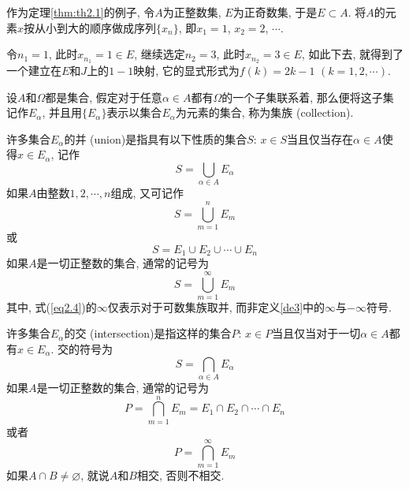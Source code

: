 \documentclass[cn,12pt,math=mtpro2,citestyle=gb7714-2015,bibstyle=gb7714-2015,twocol]{elegantbook}
\let\emptyset\varnothing
\begin{document}
\begin{example}
作为定理\ref{thm:th2.1}的例子, 令$A$为正整数集, $E$为正奇数集, 于是$E\subset A$. 将$A$的元素$x$按从小到大的顺序做成序列$\{x_n\}$, 即$x_1=1$, $x_2=2$, $\cdots$.

令$n_1=1$, 此时$x_{n_1}=1\in E$, 继续选定$n_2=3$, 此时$x_{n_2}=3\in E$, 如此下去, 就得到了一个建立在$E$和$J$上的$1-1$映射, 它的显式形式为$f(k)=2k-1$ $(k=1,2,\cdots)$.
\end{example}
\begin{definition}
设$A$和$\Omega$都是集合, 假定对于任意$ \alpha\in A$都有$\Omega$的一个子集联系着, 那么便将这子集记作$E_\alpha$, 并且用$\{E_\alpha\}$表示以集合$E_\alpha$为元素的集合, 称为集族 (collection).
\end{definition}


许多集合$E_\alpha$的并 (union)是指具有以下性质的集合$S$: $x\in S$当且仅当存在$\alpha\in A$使得$x\in E_\alpha$, 记作
\begin{equation*}\label{eq2.1}
  S=\bigcup_{\alpha\in A}E_{\alpha}
\end{equation*}
如果$A$由整数$1,2,\cdots,n$组成, 又可记作
\begin{equation*}\label{eq2.2}
  S=\bigcup_{m=1}^nE_m
\end{equation*}
或
\begin{equation*}\label{eq2.3}
  S=E_1\cup E_2\cup\cdots\cup E_n
\end{equation*}
如果$A$是一切正整数的集合, 通常的记号为
\begin{equation}\label{eq2.4}
  S=\bigcup_{m=1}^\infty E_m
\end{equation}
其中, 式(\ref{eq2.4})的$\infty$仅表示对于可数集族取并, 而非定义\ref{de3}中的$\infty$与$-\infty$符号.


许多集合$E_\alpha$的交 (intersection)是指这样的集合$P$: $x\in P$当且仅当对于一切$\alpha\in A$都有$x\in E_\alpha$. 交的符号为
\begin{equation*}\label{eq2.5}
  S=\bigcap_{\alpha\in A}E_{\alpha}
\end{equation*}
如果$A$是一切正整数的集合, 通常的记号为
\begin{equation*}
  P=\bigcap_{m=1}^nE_m=E_1\cap E_2\cap\cdots\cap E_n
\end{equation*}
或者
\begin{equation*}
  P=\bigcap_{m=1}^\infty E_m
\end{equation*}
如果$A\cap B\neq \emptyset$, 就说$A$和$B$相交, 否则不相交.
\end{document}
